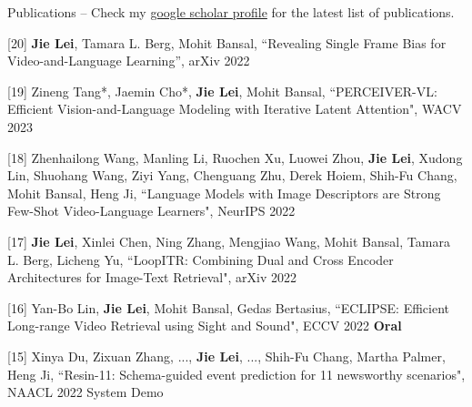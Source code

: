 \documentclass{resume} %
\begin{document}

\begin{rSection}{Publications}       
    -- Check my \href{https://scholar.google.com/citations?user=SZN9FLIAAAAJ&hl=en}{google scholar profile} for the latest list of publications.   
    
    \item {[20] 
    \textbf{Jie Lei}, Tamara L. Berg, Mohit Bansal,
    ``Revealing Single Frame Bias for Video-and-Language Learning'',
     arXiv 2022
    }      
    \item {[19] 
    Zineng Tang*, Jaemin Cho*, \textbf{Jie Lei}, Mohit Bansal, 
    ``PERCEIVER-VL: Efficient Vision-and-Language Modeling with Iterative Latent Attention", 
    WACV 2023
    }        
    \item {[18] 
    Zhenhailong Wang, Manling Li, Ruochen Xu, Luowei Zhou,  \textbf{Jie Lei}, Xudong Lin, Shuohang Wang, Ziyi Yang, Chenguang Zhu, Derek Hoiem, Shih-Fu Chang, Mohit Bansal, Heng Ji,
    ``Language Models with Image Descriptors are Strong Few-Shot Video-Language Learners",
     NeurIPS 2022
    }      
    \item {[17] 
    \textbf{Jie Lei}, Xinlei Chen, Ning Zhang, Mengjiao Wang, Mohit Bansal, Tamara L. Berg, Licheng Yu,
    ``LoopITR: Combining Dual and Cross Encoder Architectures for Image-Text Retrieval", 
    arXiv 2022
    }             
    \item {[16] 
    Yan-Bo Lin, \textbf{Jie Lei}, Mohit Bansal, Gedas Bertasius,
    ``ECLIPSE: Efficient Long-range Video Retrieval using Sight and Sound",
     ECCV 2022 {\color{bittersweet}\textbf{Oral}} 
    }              

    \item {[15] 
    Xinya Du, Zixuan Zhang, ..., \textbf{Jie Lei}, ..., Shih-Fu Chang, Martha Palmer, Heng Ji,
    ``Resin-11: Schema-guided event prediction for 11 newsworthy scenarios",
     NAACL 2022 System Demo
    }       
    

\end{rSection}
\end{document}
